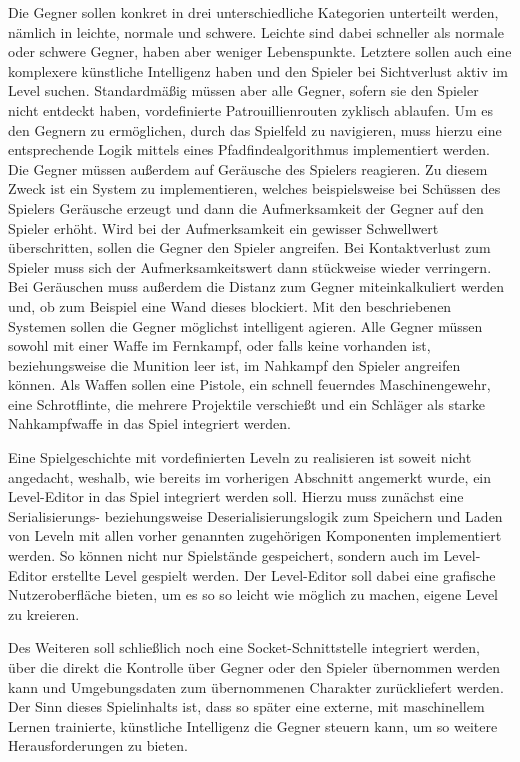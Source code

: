 Die Gegner sollen konkret in drei unterschiedliche Kategorien unterteilt werden, nämlich in leichte, normale und schwere. Leichte sind dabei schneller als normale oder schwere Gegner, haben aber weniger Lebenspunkte. Letztere sollen auch eine komplexere künstliche Intelligenz haben und den Spieler bei Sichtverlust aktiv im Level suchen. Standardmäßig müssen aber alle Gegner, sofern sie den Spieler nicht entdeckt haben, vordefinierte Patrouillienrouten zyklisch ablaufen. Um es den Gegnern zu ermöglichen, durch das Spielfeld zu navigieren, muss hierzu eine entsprechende Logik mittels eines Pfadfindealgorithmus implementiert werden. Die Gegner müssen außerdem auf Geräusche des Spielers reagieren. Zu diesem Zweck ist ein System zu implementieren, welches beispielsweise bei Schüssen des Spielers Geräusche erzeugt und dann die Aufmerksamkeit der Gegner auf den Spieler erhöht. Wird bei der Aufmerksamkeit ein gewisser Schwellwert überschritten, sollen die Gegner den Spieler angreifen. Bei Kontaktverlust zum Spieler muss sich der Aufmerksamkeitswert dann stückweise wieder verringern. Bei Geräuschen muss außerdem die Distanz zum Gegner miteinkalkuliert werden und, ob zum Beispiel eine Wand dieses blockiert. Mit den beschriebenen Systemen sollen die Gegner möglichst intelligent agieren. Alle Gegner müssen sowohl mit einer Waffe im Fernkampf, oder falls keine vorhanden ist, beziehungsweise die Munition leer ist, im Nahkampf den Spieler angreifen können. Als Waffen sollen eine Pistole, ein schnell feuerndes Maschinengewehr, eine Schrotflinte, die mehrere Projektile verschießt und ein Schläger als starke Nahkampfwaffe in das Spiel integriert werden.

Eine Spielgeschichte mit vordefinierten Leveln zu realisieren ist soweit nicht angedacht, weshalb, wie bereits im vorherigen Abschnitt angemerkt wurde, ein Level-Editor in das Spiel integriert werden soll. Hierzu muss zunächst eine Serialisierungs- beziehungsweise Deserialisierungslogik zum Speichern und Laden von Leveln mit allen vorher genannten zugehörigen Komponenten implementiert werden. So können nicht nur Spielstände gespeichert, sondern auch im Level-Editor erstellte Level gespielt werden. Der Level-Editor soll dabei eine grafische Nutzeroberfläche bieten, um es so so leicht wie möglich zu machen, eigene Level zu kreieren.

Des Weiteren soll schließlich noch eine Socket-Schnittstelle integriert werden, über die direkt die Kontrolle über Gegner oder den Spieler übernommen werden kann und Umgebungsdaten zum übernommenen Charakter zurückliefert werden. Der Sinn dieses Spielinhalts ist, dass so später eine externe, mit maschinellem Lernen trainierte, künstliche Intelligenz die Gegner steuern kann, um so weitere Herausforderungen zu bieten.

